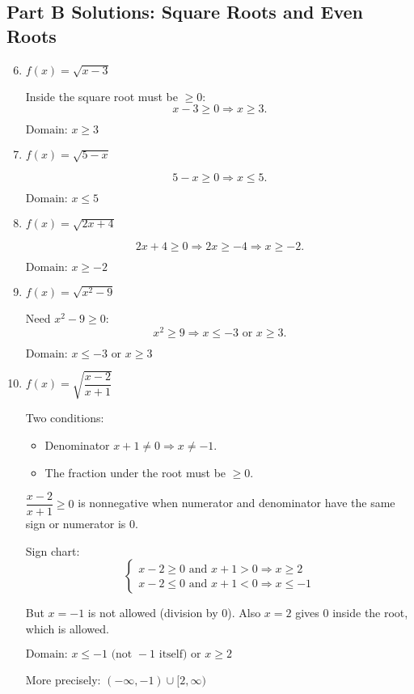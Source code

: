 \documentclass[12pt]{article}
\begin{document}
\subsection*{Part B Solutions: Square Roots and Even Roots}
\begin{enumerate}
  \setcounter{enumi}{5}
  \item \(f(x) = \sqrt{x - 3}\)

  Inside the square root must be \(\ge 0\):
  \[
  x - 3 \ge 0 \Rightarrow x \ge 3.
  \]

  \(\boxed{\text{Domain: } x \ge 3}\)

  \item \(f(x) = \sqrt{5 - x}\)

  \[
  5 - x \ge 0 \Rightarrow x \le 5.
  \]

  \(\boxed{\text{Domain: } x \le 5}\)

  \item \(f(x) = \sqrt{2x + 4}\)

  \[
  2x + 4 \ge 0 \Rightarrow 2x \ge -4 \Rightarrow x \ge -2.
  \]

  \(\boxed{\text{Domain: } x \ge -2}\)

  \item \(f(x) = \sqrt{x^2 - 9}\)

  Need \(x^2 - 9 \ge 0\):
  \[
  x^2 \ge 9 \Rightarrow x \le -3 \text{ or } x \ge 3.
  \]

  \(\boxed{\text{Domain: } x \le -3 \text{ or } x \ge 3}\)

  \item \(f(x) = \sqrt{\dfrac{x - 2}{x + 1}}\)

  Two conditions:
  \begin{itemize}
    \item Denominator \(x + 1 \ne 0 \Rightarrow x \ne -1.\)
    \item The fraction under the root must be \(\ge 0.\)
  \end{itemize}

  \(\dfrac{x - 2}{x + 1} \ge 0\) is nonnegative when numerator and denominator have the same sign or numerator is 0.

  Sign chart:
  \[
  \begin{cases}
  x - 2 \ge 0 \text{ and } x + 1 > 0 \Rightarrow x \ge 2 \\
  x - 2 \le 0 \text{ and } x + 1 < 0 \Rightarrow x \le -1
  \end{cases}
  \]

  But \(x = -1\) is not allowed (division by 0).  
  Also \(x = 2\) gives 0 inside the root, which is allowed.

  \(\boxed{\text{Domain: } x \le -1 \text{ (not } -1\text{ itself)} \text{ or } x \ge 2}\)

  More precisely:
  \(\boxed{(-\infty, -1) \cup [2, \infty)}\)
\end{enumerate}
\end{document}
